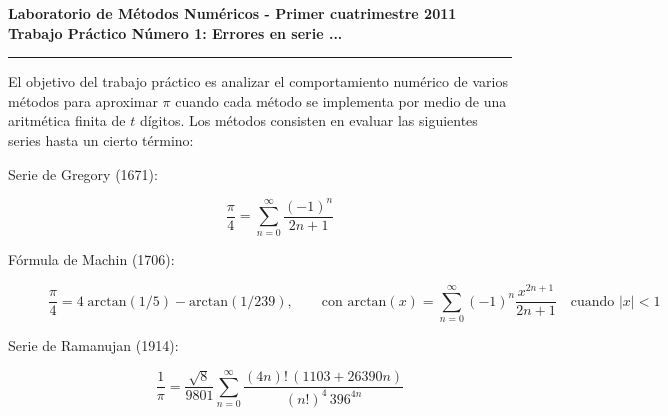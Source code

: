 \begin{centering}
\bf Laboratorio de M\'etodos Num\'ericos - Primer cuatrimestre 2011 \\
\bf Trabajo Pr\'actico N\'umero 1: Errores en serie ... \\
\end{centering}

\vskip 25pt
\hrule
\vskip 11pt

El objetivo del trabajo pr\'actico es analizar el comportamiento num\'erico de varios m\'etodos para aproximar $\pi$ cuando cada m\'etodo se implementa por medio de una aritm\'etica finita de $t$ d\'igitos. Los m\'etodos consisten en evaluar las siguientes series hasta un cierto t\'ermino:
\begin{description}
    \item[Serie de Gregory (1671):]
      \begin{equation*}
      \frac{\pi}{4} = \sum_{n=0}^{\infty} \frac{\left(-1\right)^n}{2n+1}
      \end{equation*}
    \item[F\'ormula de Machin (1706):]
      \begin{equation*}
      \frac{\pi}{4} = 4 \; \mathrm{arctan}(1/5) - \mathrm{arctan}(1/239), \qquad \text{con } \mathrm{arctan}(x) = \sum_{n=0}^{\infty} \left(-1\right)^n \frac{x^{2n+1}}{2n+1} \quad \text{cuando } \left|x\right|<1
      \end{equation*}
    \item[Serie de Ramanujan (1914):]
      \begin{equation*}
      \frac{1}{\pi} = \frac{\sqrt{8}}{9801} \sum_{n=0}^{\infty} \frac{(4n)! \, (1103 + 26390 n)}{(n!)^4 \, 396^{4n}}
      \end{equation*}
\end{description}

